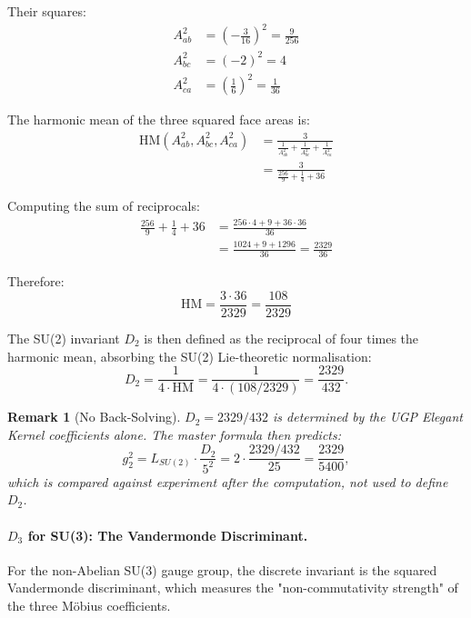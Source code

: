 \documentclass[11pt,twocolumn]{article}
\newtheorem{remark}{Remark}[section]
\begin{document}
Their squares:
\begin{align}
    A_{ab}^2 &= \left(-\frac{3}{16}\right)^2 = \frac{9}{256} \\
    A_{bc}^2 &= (-2)^2 = 4 \\
    A_{ca}^2 &= \left(\frac{1}{6}\right)^2 = \frac{1}{36}
\end{align}

The harmonic mean of the three squared face areas is:
\begin{align}
    \text{HM}(A_{ab}^2, A_{bc}^2, A_{ca}^2) &= \frac{3}{\frac{1}{A_{ab}^2} + \frac{1}{A_{bc}^2} + \frac{1}{A_{ca}^2}} \\
    &= \frac{3}{\frac{256}{9} + \frac{1}{4} + 36}
\end{align}

Computing the sum of reciprocals:
\begin{align}
    \frac{256}{9} + \frac{1}{4} + 36 &= \frac{256 \cdot 4 + 9 + 36 \cdot 36}{36} \\
    &= \frac{1024 + 9 + 1296}{36} = \frac{2329}{36}
\end{align}

Therefore:
\begin{equation}
    \text{HM} = \frac{3 \cdot 36}{2329} = \frac{108}{2329}
\end{equation}

The SU(2) invariant $D_2$ is then defined as the reciprocal of four times the harmonic mean, absorbing the SU(2) Lie-theoretic normalisation:
\begin{equation}
    D_2 = \frac{1}{4 \cdot \mathrm{HM}} = \frac{1}{4 \cdot (108/2329)} = \frac{2329}{432}.
\end{equation}

\begin{remark}[No Back-Solving]
$D_2 = 2329/432$ is determined by the UGP Elegant Kernel coefficients alone. The master formula then predicts:
\[
g_2^2 = L_{SU(2)} \cdot \frac{D_2}{5^2} = 2 \cdot \frac{2329/432}{25} = \frac{2329}{5400},
\]
which is compared against experiment \emph{after} the computation, not used to define $D_2$.
\end{remark}

\paragraph{$D_3$ for SU(3): The Vandermonde Discriminant.}
For the non-Abelian SU(3) gauge group, the discrete invariant is the squared Vandermonde discriminant, which measures the "non-commutativity strength" of the three Möbius coefficients.
\end{document}
